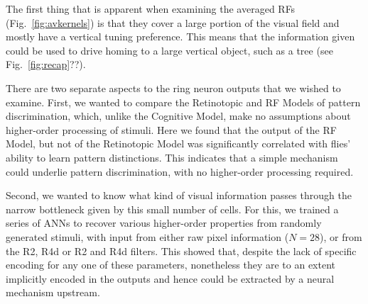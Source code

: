 The first thing that is apparent when examining the averaged RFs (Fig.~\ref{fig:avkernels}) is that they cover a large portion of the visual field and mostly have a vertical tuning preference.
This means that the information given could be used to drive homing to a large vertical object, such as a tree (see Fig.~\ref{fig:recap}??).

\begin{comment}
\texthl{[I haven't included anything about `bar detection' or `bar homing' here -- I cut it out before as discussed.
Have some notes though: see below.]}

\texthl{[AP Notes: I don't think it is needed here. If we mention behavioural tasks in general then can bring bars in to the first section. ]}
\end{comment}

There are two separate aspects to the ring neuron outputs that we wished to examine.
First, we wanted to compare the Retinotopic and RF Models of pattern discrimination, which, unlike the Cognitive Model, make no assumptions about higher-order processing of stimuli.
Here we found that the output of the RF Model, but not of the Retinotopic Model was significantly correlated with flies' ability to learn pattern distinctions.
This indicates that a simple mechanism could underlie pattern discrimination, with no higher-order processing required.

Second, we wanted to know what kind of visual information passes through the narrow bottleneck given by this small number of cells.
For this, we trained a series of \acp{ANN} to recover various higher-order properties from randomly generated stimuli, with input from either raw pixel information ($N=28$), or from the R2, R4d or R2 and R4d filters.
This showed that, despite the lack of specific encoding for any one of these parameters, nonetheless they are to an extent implicitly encoded in the outputs and hence could be extracted by a neural mechanism upstream.



